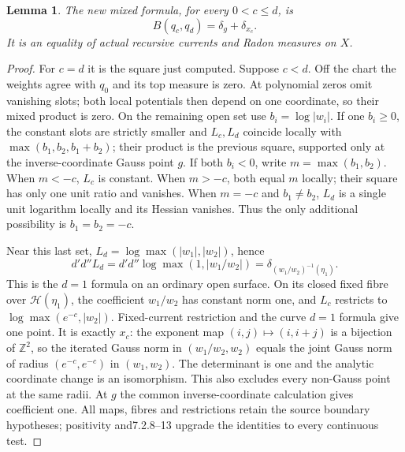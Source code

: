 \documentclass[11pt]{article}
\newtheorem{lemma}[theorem]{Lemma}
\newcommand{\DD}{d'd''}
\begin{document}
\begin{lemma}\label{branch:mixed}
The new mixed formula, for every $0<c\le d$, is
\[
 B(q_c,q_d)=\delta_g+\delta_{x_c}.
\]
It is an equality of actual recursive currents and Radon measures on $X$.
\end{lemma}
\begin{proof}
For $c=d$ it is the square just computed. Suppose $c<d$.
Off the chart the weights agree with $q_0$ and its top measure is zero.
At polynomial zeros omit vanishing slots; both local potentials then
depend on one coordinate, so their mixed product is zero.
On the remaining open set use $b_i=\log|w_i|$.
If one $b_i\ge0$, the constant slots are strictly smaller and $L_c,L_d$
coincide locally with $\max(b_1,b_2,b_1+b_2)$; their product is the
previous square, supported only at the inverse-coordinate Gauss point $g$.
If both $b_i<0$, write $m=\max(b_1,b_2)$. When $m<-c$, $L_c$ is constant.
When $m>-c$, both equal $m$ locally; their square has only one unit ratio
and vanishes. When $m=-c$ and $b_1\ne b_2$, $L_d$ is a single unit
logarithm locally and its Hessian vanishes. Thus the only additional
possibility is $b_1=b_2=-c$.

Near this last set, $L_d=\log\max(|w_1|,|w_2|)$, hence
\[
 \DD L_d=\DD\log\max(1,|w_1/w_2|)
           =\delta_{(w_1/w_2)^{-1}(\eta_1)}.
\]
This is the $d=1$ formula on an ordinary open surface. On its closed fixed
fibre over $\mathscr H(\eta_1)$, the coefficient $w_1/w_2$ has constant
norm one, and $L_c$ restricts to $\log\max(e^{-c},|w_2|)$.
Fixed-current restriction and the curve $d=1$ formula give one point.
It is exactly $x_c$: the exponent map $(i,j)\mapsto(i,i+j)$ is a bijection
of $\mathbb Z^2$, so the iterated Gauss norm in $(w_1/w_2,w_2)$ equals
the joint Gauss norm of radius $(e^{-c},e^{-c})$ in $(w_1,w_2)$.
The determinant is one and the analytic coordinate change is an
isomorphism. This also excludes every non-Gauss point at the same radii.
At $g$ the common inverse-coordinate calculation gives coefficient one.
All maps, fibres and restrictions retain the source boundary hypotheses;
positivity and7.2.8--13 upgrade the identities to every continuous test.
\end{proof}
\end{document}
